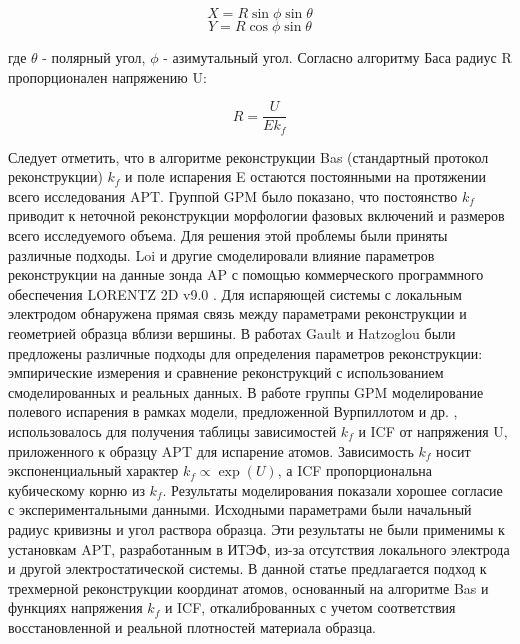 \begin{equation}
	\label{eq:equation3_1}
	X = R \sin{\phi}\sin{\theta}	
\end{equation}
\begin{equation}
	\label{eq:equation3_2}
	Y = R \cos{\phi}\sin{\theta}	
\end{equation}

где $\theta$ - полярный угол, $\phi$ - азимутальный угол. Согласно алгоритму Баса радиус R пропорционален напряжению U: 

\begin{equation}
	\label{eq:equation3_3}
	R = \frac{U}{E k_f}
\end{equation}

Следует отметить, что в алгоритме реконструкции Bas (стандартный протокол реконструкции) $k_f$ и поле испарения E остаются постоянными на протяжении всего исследования APT. Группой GPM \cite{Gault11_Loi} было показано, что постоянство $k_f$ приводит к неточной реконструкции морфологии фазовых включений и размеров всего исследуемого объема. Для решения этой проблемы были приняты различные подходы.
Loi и другие \cite{Loi13} смоделировали влияние параметров реконструкции на данные зонда AP с помощью коммерческого программного обеспечения LORENTZ 2D v9.0 \cite{Asi02}. Для испаряющей системы с локальным электродом обнаружена прямая связь между параметрами реконструкции и геометрией образца вблизи вершины.
В работах Gault \cite{Gault11_Loi} и Hatzoglou \cite{Hatzoglou19} были предложены различные подходы для определения параметров реконструкции: эмпирические измерения и сравнение реконструкций с использованием смоделированных и реальных данных.
В работе группы GPM \cite{Hatzoglou19} моделирование полевого испарения в рамках модели, предложенной Вурпиллотом и др. \cite{Vurpillot13}, использовалось для получения таблицы зависимостей $k_f$ и ICF от напряжения U, приложенного к образцу APT для испарение атомов. Зависимость $k_f$ носит экспоненциальный характер $k_f \propto \exp(U)$, а ICF пропорциональна кубическому корню из $k_f$. Результаты моделирования показали хорошее согласие с экспериментальными данными. Исходными параметрами были начальный радиус кривизны и угол раствора образца. Эти результаты не были применимы к установкам APT, разработанным в ИТЭФ, из-за отсутствия локального электрода и другой электростатической системы.
В данной статье предлагается подход к трехмерной реконструкции координат атомов, основанный на алгоритме Bas и функциях напряжения $k_f$ и ICF, откалиброванных с учетом соответствия восстановленной и реальной плотностей материала образца.

